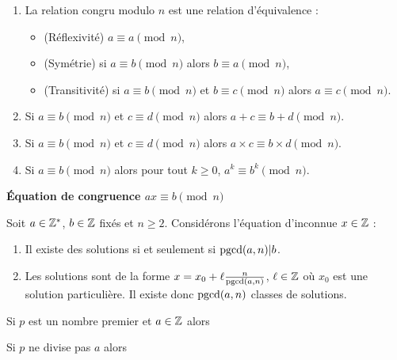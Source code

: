 \documentclass[10pt,class=article,crop=false]{standalone}
\begin{document}
\begin{multicols}{2}
\begin{proposition}
	\sauteligne
	\begin{enumerate}
		\item La relation \og congru modulo $n$ \fg{} est une relation d'équivalence :
		\begin{itemize}
			\item (Réflexivité) $a \equiv a \pmod n$,
			\item (Symétrie) si $a \equiv b \pmod n$ alors $b \equiv a \pmod n$,
			\item (Transitivité) si $a \equiv b \pmod n$ et $b \equiv c \pmod n$ alors $a \equiv c \pmod n$.
		\end{itemize}
		\item Si $a \equiv b \pmod n$ et $c \equiv d \pmod n$ alors
		$a+c \equiv b+d \pmod n$.
		\item Si $a \equiv b \pmod n$ et $c \equiv d \pmod n$ alors
		$a\times c \equiv b \times d \pmod n$.
		\item Si $a \equiv b \pmod n$ alors pour tout $k \ge 0$, $a^k \equiv b^k \pmod n$.
	\end{enumerate}
\end{proposition}



\textbf{\'Equation de congruence $ax \equiv b \pmod n$}

\begin{proposition}
	Soit $a \in \mathbb{Z}^*$, $b \in \mathbb{Z}$ fixés et $n \ge 2$.
	Considérons l'équation
	 d'inconnue $x \in \mathbb{Z}$ :
	\begin{enumerate}
		\item Il existe des solutions si et seulement si $\mathop{\text{pgcd}}(a,n) | b$.
		\item Les solutions sont de la forme $x = x_0 + \ell \frac{n}{\mathop{\text{pgcd}}(a,n)}$, $\ell \in \mathbb{Z}$
		où $x_0$ est une solution particulière. Il existe donc $\mathop{\text{pgcd}}(a,n)$ classes de solutions.
	\end{enumerate}
\end{proposition}



\begin{theoreme}
	Si $p$ est un nombre premier et $a \in \mathbb{Z}$ alors
\end{theoreme}

\begin{corollaire}
	Si $p$ ne divise pas $a$ alors
\end{corollaire}



\end{multicols}
\end{document}
